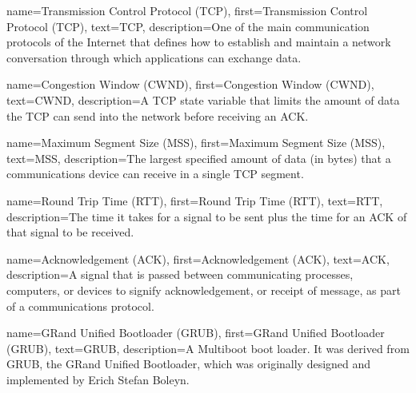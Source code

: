 {
    name={Transmission Control Protocol (TCP)},
    first={Transmission Control Protocol (TCP)},
    text={TCP},
    description={One of the main communication protocols of the Internet that defines how to establish and maintain a network conversation through which applications can exchange data.}
}

{
    name={Congestion Window (CWND)},
    first={Congestion Window (CWND)},
    text={CWND},
    description={A TCP state variable that limits the amount of data the TCP can send into the network before receiving an ACK.}
}

{
    name={Maximum Segment Size (MSS)},
    first={Maximum Segment Size (MSS)},
    text={MSS},
    description={The largest specified amount of data (in bytes) that a communications device can receive in a single TCP segment.}
}

{
    name={Round Trip Time (RTT)},
    first={Round Trip Time (RTT)},
    text={RTT},
    description={The time it takes for a signal to be sent plus the time for an ACK of that signal to be received.}
}

{
    name={Acknowledgement (ACK)},
    first={Acknowledgement (ACK)},
    text={ACK},
    description={A signal that is passed between communicating processes, computers, or devices to signify acknowledgement, or receipt of message, as part of a communications protocol.}
}

{
    name={GRand Unified Bootloader (GRUB)},
    first={GRand Unified Bootloader (GRUB)},
    text={GRUB},
    description={A Multiboot boot loader. It was derived from GRUB, the GRand Unified Bootloader, which was originally designed and implemented by Erich Stefan Boleyn.}
}